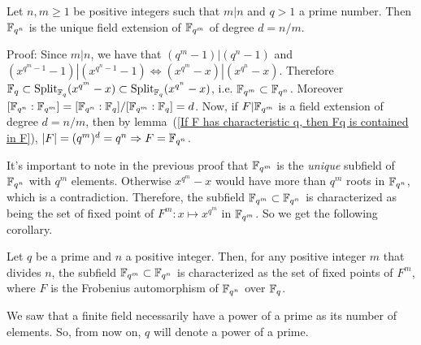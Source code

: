 \begin{dang}
    \begin{theorem}\cite{lidl1994introduction}\label{Fqn is the unique extension of Fqm of degree n/m}
     Let $n,m\geq1$ be positive integers such that $m|n$ and $q>1$ a prime number. Then $\mathbb{F}_{q^n}$ is the unique field extension of $\mathbb{F}_{q^m}$ of degree $d=n/m$.
    \end{theorem}
\end{dang}
Proof: Since $m|n$, we have that $(q^m-1)|(q^n-1)$ and $(x^{q^m-1}-1)|(x^{q^n-1}-1)\iff (x^{q^m}-x)|(x^{q^n}-x)$. Therefore $\mathbb{F}_q\subset\text{Split}_{\mathbb{F}_q}(x^{q^m}-x)\subset\text{Split}_{\mathbb{F}_q}(x^{q^n}-x)$, i.e. $\mathbb{F}_{q^m}\subset \mathbb{F}_{q^n}$. Moreover $[\mathbb{F}_{q^n}:\mathbb{F}_{q^m}]=[\mathbb{F}_{q^n}:\mathbb{F}_q]/[\mathbb{F}_{q^m}:\mathbb{F}_q]=d$. Now, if $F|\mathbb{F}_{q^m}$ is a field extension of degree $d=n/m$, then by lemma~(\ref{If F has characteristic q, then Fq is contained in F}), $|F|=(q^m)^d=q^n\Rightarrow F=\mathbb{F}_{q^n}$.\par
It's important to note in the previous proof that $\mathbb{F}_{q^m}$ is the \textit{unique} subfield of $\mathbb{F}_{q^n}$ with $q^m$ elements. Otherwise $x^{q^m}-x$ would have more than $q^m$ roots in $\mathbb{F}_{q^n}$, which is a contradiction. Therefore, the subfield $\mathbb{F}_{q^m}\subset \mathbb{F}_{q^n}$ is characterized as being the set of fixed point of $F^m:x\mapsto x^{q^m}$ in $\mathbb{F}_{q^m}$. So we get the following corollary.
\begin{dang}
    \begin{corollary}\label{characterization of M_m inside M_n}
        Let $q$ be a prime and $n$ a positive integer. Then, for any positive integer $m$ that divides $n$, the subfield $\mathbb{F}_{q^m}\subset \mathbb{F}_{q^n}$ is characterized as the set of fixed points of $F^m$, where $F$ is the Frobenius automorphism of $\mathbb{F}_{q^n}$ over $\mathbb{F}_q$.
    \end{corollary}
\end{dang}
\begin{dang}
    \begin{notation}
        We saw that a finite field necessarily have a power of a prime as its number of elements. So, from now on, $q$ will denote a power of a prime.
    \end{notation}
\end{dang}

